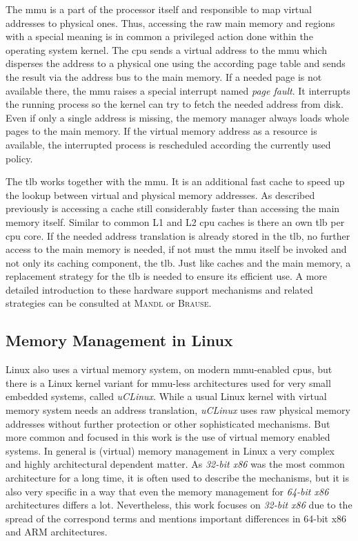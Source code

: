 The \ac{mmu} is a part of the processor itself and responsible to map virtual addresses to physical ones. 
Thus, accessing the raw main memory and regions with a special meaning is in common a privileged action done within the operating system kernel. 
The \ac{cpu} sends a virtual address to the \ac{mmu} which disperses the address to a physical one using the according page table and sends the result via the address bus to the main memory.
If a needed page is not available there, the \ac{mmu} raises a special interrupt named \textit{page fault}.
It interrupts the running process so the kernel can try to fetch the needed address from disk.
Even if only a single address is missing, the memory manager always loads whole pages to the main memory.
If the virtual memory address as a resource is available, the interrupted process is rescheduled according the currently used policy\cite{mandl2014Grundkurs}.

The \ac{tlb} works together with the \ac{mmu}.
It is an additional fast cache to speed up the lookup between virtual and physical memory addresses. 
As described previously is accessing a cache still considerably faster than accessing the main memory itself.
Similar to common L1 and L2 \ac{cpu} caches is there an own \ac{tlb} per \ac{cpu} core.
If the needed address translation is already stored in the \ac{tlb}, no further access to the main memory is needed, if not must the \ac{mmu} itself be invoked and not only its caching component, the \ac{tlb}.
Just like caches and the main memory, a replacement strategy for the \ac{tlb} is needed to ensure its efficient use.
A more detailed introduction to these hardware support mechanisms and related strategies can be consulted at \textsc{Mandl}\cite{mandl2014Grundkurs} or \textsc{Brause}\cite{brause2017betriebssysteme}.

 
\subsection{Memory Management in Linux}\label{sec:mm:linux}
Linux also uses a virtual memory system, on modern \ac{mmu}-enabled \acp{cpu}, but there is a Linux kernel variant for \ac{mmu}-less architectures used for very small embedded systems, called \textit{uCLinux}.
While a usual Linux kernel with virtual memory system needs an address translation, \textit{uCLinux} uses raw physical memory addresses without further protection or other sophisticated mechanisms.
But more common and focused in this work is the use of virtual memory enabled systems\cite{lfd430}.
In general is (virtual) memory management in Linux a very complex and highly architectural dependent matter.
As \textit{32-bit x86} was the most common architecture for a long time, it is often used to describe the mechanisms, but it is also very specific in a way that even the memory management for \textit{64-bit x86} architectures differs a lot.
Nevertheless, this work focuses on \textit{32-bit x86} due to the spread of the correspond terms and mentions important differences in 64-bit x86 and ARM architectures.

